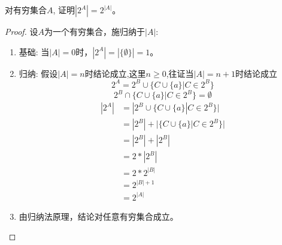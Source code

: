 \begin{example}
对有穷集合$A$, 证明$|2^A| = 2^{|A|}$。
\begin{proof}
	设$A$为一个有穷集合，施归纳于$|A|$:
	\begin{enumerate}
		\item 基础: 当$|A|=0$时，$|2^A|=|\{\emptyset \}|=1$。
		\item 归纳: 假设$|A|=n$时结论成立,这里$n\ge 0$,往证当$|A|=n+1$时结论成立
		$$2^A = 2^B \cup \{C\cup \{ a\} | C\in 2^B\}$$
		$$2^B\cap \{C\cup \{a\}|C\in 2^B \} = \emptyset$$
		\begin{align*}
		|2^A|&=|2^B \cup \{C\cup \{ a\} | C\in 2^B\}|\\
		&=|2^B|+|\{C\cup \{a\}|C\in 2^B \}| \\
		&=|2^B|+|2^B| \\
		&=2\ast |2^B| \\
		&=2\ast 2^{|B|} \\
		&=2^{|B|+1}   \\
		&=2^{|A|}
		\end{align*}
		\item 由归纳法原理，结论对任意有穷集合成立。
	\end{enumerate}
\end{proof}	
\end{example}

